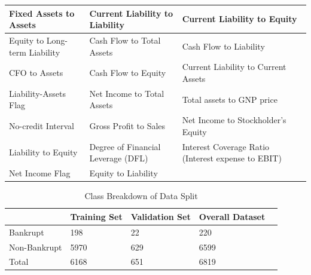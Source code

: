 \documentclass[12pt]{report}
\begin{document}
\begin{table}[H]
\begin{adjustbox}{width=\columnwidth,center}
\begin{tabular}{|l|l|l|}
Fixed Assets to Assets                                  & Current Liability to Liability              & Current Liability to Equity                        \\ \hline
Equity to Long-term Liability                           & Cash Flow to Total Assets                   & Cash Flow to Liability                             \\ \hline
CFO to Assets                                           & Cash Flow to Equity                         & Current Liability to Current Assets                \\ \hline
Liability-Assets Flag                                   & Net Income to Total Assets                  & Total assets to GNP price                          \\ \hline
No-credit Interval                                      & Gross Profit to Sales                       & Net Income to Stockholder's Equity                 \\ \hline
Liability to Equity                                     & Degree of Financial Leverage (DFL)          & Interest Coverage Ratio (Interest expense to EBIT) \\ \hline
Net Income Flag                                         & Equity to Liability                         &                                                    \\ \hline
\end{tabular}
\end{adjustbox}
\end{table}

\begin{table}[H]
\caption{Class Breakdown of Data Split} \label{tab:Split}
\begin{tabular}{lllll}
\hline
             & Training Set & Validation Set & Overall Dataset &  \\ \hline
Bankrupt     & 198          & 22             & 220            &  \\
Non-Bankrupt & 5970         & 629            & 6599           &  \\ \hline
Total        & 6168         & 651            & 6819           & 

\end{tabular}
\end{table}
\end{document}
